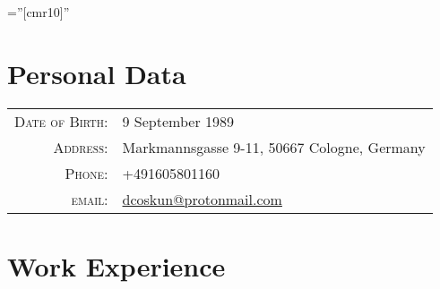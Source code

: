 \documentclass[a4paper,10pt]{article} %
\begin{document}
\pagestyle{empty} %

\font\fb=''[cmr10]'' %


\par{\bigskip\par} %

\section{Personal Data}

\begin{tabular}{rl}
\textsc{Date of Birth:} & 9 September 1989 \\
\textsc{Address:} & Markmannsgasse 9-11, 50667 Cologne, Germany \\
\textsc{Phone:} & +491605801160‬ \\
\textsc{email:} & \href{mailto:dcoskun@protonmail.com}{dcoskun@protonmail.com}
\end{tabular}



\section{Work Experience}
\end{document}
